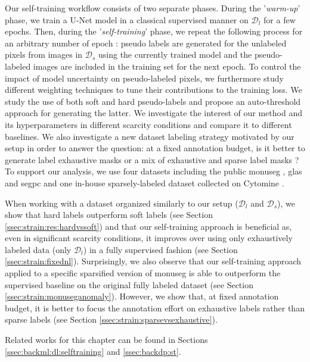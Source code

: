 Our self-training workflow consists of two separate phases. During the '\textit{warm-up}' phase, we train a U-Net \parencite{ronneberger2015unet} model in a classical supervised manner on $\mathcal{D}_l$ for a few epochs. Then, during the '\textit{self-training}' phase, we repeat the following process for an arbitrary number of epoch : pseudo labels are generated for the unlabeled pixels from images in $\mathcal{D}_s$ using the currently trained model and the pseudo-labeled images are included in the training set for the next epoch. To control the impact of model uncertainty on pseudo-labeled pixels, we furthermore study different weighting techniques to tune their contributions to the training loss. We study the use of both soft and hard pseudo-labels and propose an auto-threshold approach for generating the latter. We investigate the interest of our method and its hyperparameters in different scarcity conditions and compare it to different baselines. We also investigate a new dataset labeling strategy motivated by our setup in order to answer the question: at a fixed annotation budget, is it better to generate label exhaustive masks or a mix of exhaustive and sparse label masks ? To support our analysis, we use four datasets including the public \acrshort{monuseg} \parencite{kumar2019multi}, \acrshort{glas} \parencite{sirinukunwattana2017gland} and \acrshort{segpc} \parencite{gupta2021segpc} and one in-house sparsely-labeled dataset collected on Cytomine \parencite{maree2016collaborative}.  

When working with a dataset organized similarly to our setup ($\mathcal{D}_l$ and $\mathcal{D}_s$), we show that hard labels outperform soft labels (see Section \ref{ssec:strain:res:hardvssoft}) and that our self-training approach is beneficial as, even in significant scarcity conditions, it improves over using only exhaustively labeled data (only $\mathcal{D}_l$) in a fully supervised fashion (see Section \ref{ssec:strain:fixednl}). Surprisingly, we also observe that our self-training approach applied to a specific sparsified version of \acrshort{monuseg} is able to outperform the supervised baseline on the original fully labeled dataset (see Section \ref{ssec:strain:monuseganomaly}). However, we show that, at fixed annotation budget, it is better to focus the annotation effort on exhaustive labels rather than sparse labels (see Section \ref{ssec:strain:sparsevsexhaustive}).

Related works for this chapter can be found in Sections \ref{ssec:backml:dl:selftraining} and \ref{ssec:backdp:st}.


